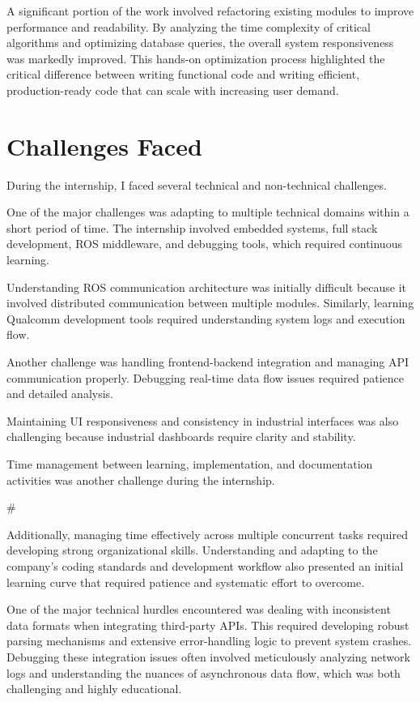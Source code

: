 \documentclass[12pt,a4paper]{report}
\begin{document}
A significant portion of the work involved refactoring existing modules to improve performance and readability. By analyzing the time complexity of critical algorithms and optimizing database queries, the overall system responsiveness was markedly improved. This hands-on optimization process highlighted the critical difference between writing functional code and writing efficient, production-ready code that can scale with increasing user demand.




\section{Challenges Faced}

During the internship, I faced several technical and non-technical challenges.


One of the major challenges was adapting to multiple technical domains within a short period of time. The internship involved embedded systems, full stack development, ROS middleware, and debugging tools, which required continuous learning.


Understanding ROS communication architecture was initially difficult because it involved distributed communication between multiple modules. Similarly, learning Qualcomm development tools required understanding system logs and execution flow.


Another challenge was handling frontend-backend integration and managing API communication properly. Debugging real-time data flow issues required patience and detailed analysis.


Maintaining UI responsiveness and consistency in industrial interfaces was also challenging because industrial dashboards require clarity and stability.


Time management between learning, implementation, and documentation activities was another challenge during the internship.


\#


Additionally, managing time effectively across multiple concurrent tasks required developing strong organizational skills. Understanding and adapting to the company's coding standards and development workflow also presented an initial learning curve that required patience and systematic effort to overcome.


One of the major technical hurdles encountered was dealing with inconsistent data formats when integrating third-party APIs. This required developing robust parsing mechanisms and extensive error-handling logic to prevent system crashes. Debugging these integration issues often involved meticulously analyzing network logs and understanding the nuances of asynchronous data flow, which was both challenging and highly educational.
\end{document}

